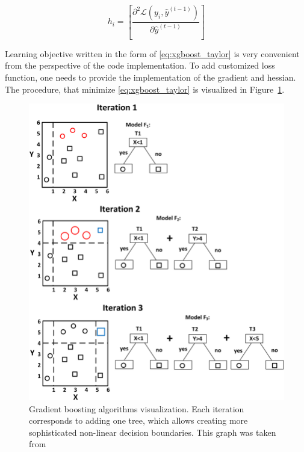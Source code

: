 \begin{equation}
    h_i = \left[\frac{\partial^2 \mathcal{L}(y_{i},\hat{y}^{(t-1)})}{\partial \hat{y}^{(t-1)}} \right]
\end{equation}

Learning objective written in the form of \ref{eq:xgboost_taylor} is very convenient from the perspective of the code implementation. To add customized loss function, one needs to provide the implementation of the gradient and hessian. The procedure, that minimize \ref{eq:xgboost_taylor} is visualized in Figure~\ref{fig:GB_visualization}. 

\begin{figure}
\centering
\includegraphics[scale=0.8]{figures/GB_visualization.png}
\caption{Gradient boosting algorithms visualization. Each iteration corresponds to adding one tree, which allows creating more sophisticated non-linear decision boundaries. 
This graph was taken from~\cite{GB_visualization}
\label{fig:GB_visualization}}
\end{figure}
  
